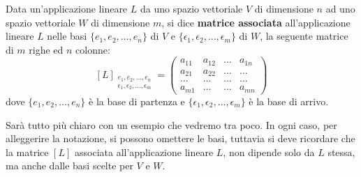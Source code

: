 \begin{definition}
	Data un'applicazione lineare $L$ da uno spazio vettoriale $V$ di dimensione $n$ ad uno spazio vettoriale
	$W$ di dimensione $m$, si dice \textbf{matrice associata} all'applicazione lineare $L$ nelle basi
	$\{e_1, e_2, \dots, e_n\}$ di $V$ e $\{\epsilon_1, \epsilon_2, \dots, \epsilon_m\}$ di $W$, la seguente
	matrice di $m$ righe ed $n$ colonne:
	\[
		[L]_{\substack{
					e_1, e_2, \dots, e_n\\
					\epsilon_1, \epsilon_2, \dots, \epsilon_m
				}} = \begin{pmatrix}
			a_{11} & a_{12} & \dots & a_{1n} \\
			a_{21} & a_{22} & \dots & \dots  \\
			\dots  & \dots  & \dots & \dots  \\
			a_{m1} & \dots  & \dots & a_{mn}
		\end{pmatrix}
	\]
	dove $\{e_1, e_2, \dots, e_n\}$ è la base di partenza e $\{\epsilon_1, \epsilon_2, \dots, \epsilon_m\}$ è
	la base di arrivo.
\end{definition}

Sarà tutto più chiaro con un esempio che vedremo tra poco. In ogni caso, per alleggerire la notazione, si
possono omettere le basi, tuttavia si deve ricordare che la matrice $[L]$ associata all'applicazione lineare
$L$, non dipende solo da $L$ stessa, ma anche dalle basi scelte per $V$ e $W$.

